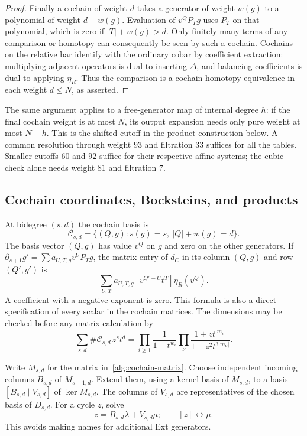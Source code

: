 \documentclass[11pt]{article}
\theoremstyle{definition}
\theoremstyle{remark}
\numberwithin{equation}{section}
\begin{document}
\begin{proof}
Finally a cochain of weight $d$ takes a generator of weight $w(g)$ to
a polynomial of weight $d-w(g)$.  Evaluation of $v^QP_Tg$ uses
$P_T$ on that polynomial, which is zero if $|T|+w(g)>d$.
Only finitely many terms of any comparison or homotopy can consequently
be seen by such a cochain.  Cochains on the relative bar identify with
the ordinary cobar by coefficient extraction: multiplying adjacent
operators is dual to inserting $\Delta$, and balancing coefficients
is dual to applying $\eta_R$.  Thus the comparison is a cochain
homotopy equivalence in each weight $d\leq N$, as asserted.
\end{proof}

The same argument applies to a free-generator map of internal degree
$h$: if the final cochain weight is at most $N$, its output expansion
needs only pure weight at most $N-h$.  This is the shifted cutoff in
the product construction below.  A common resolution through weight
$93$ and filtration $33$ suffices for all the tables.  Smaller cutoffs
$60$ and $92$ suffice for their respective affine systems; the cubic
check alone needs weight $81$ and filtration $7$.

\subsection{Cochain coordinates, Bocksteins, and products}

At bidegree $(s,d)$ the cochain basis is
\begin{equation}\label{alg:cochain-basis}
 \mathcal C_{s,d}=\{(Q,g):s(g)=s,\ |Q|+w(g)=d\}.
\end{equation}
The basis vector $(Q,g)$ has value $v^Q$ on $g$ and zero on the other
generators.  If
$\partial_{s+1}g'=\sum a_{U,T,g}v^UP_Tg$, the matrix entry of $d_C$
in its column $(Q,g)$ and row $(Q',g')$ is
\begin{equation}\label{alg:cochain-matrix}
 \sum_{U,T}a_{U,T,g}
       [v^{Q'-U}t^T]\eta_R(v^Q).
\end{equation}
A coefficient with a negative exponent is zero.  This formula is also
a direct specification of every scalar in the cochain matrices.
The dimensions may be checked before any matrix calculation by
\begin{equation}\label{alg:dimension-series}
 \sum_{s,d}\#\mathcal C_{s,d}\,z^st^d
 =\prod_{i\geq1}\frac1{1-t^{w_i}}
    \prod_{\nu}\frac{1+zt^{|m_\nu|}}
                       {1-z^2t^{3|m_\nu|}}.
\end{equation}

Write $M_{s,d}$ for the matrix in~\eqref{alg:cochain-matrix}.
Choose independent incoming columns $B_{s,d}$ of $M_{s-1,d}$.
Extend them, using a kernel basis of $M_{s,d}$, to a basis
$[B_{s,d}\mid V_{s,d}]$ of $\ker M_{s,d}$.  The columns of $V_{s,d}$
are representatives of the chosen basis of $D_{s,d}$.  For a cycle
$z$, solve
\begin{equation}\label{alg:quotient-coordinates}
 z=B_{s,d}\lambda+V_{s,d}\mu;
 \qquad [z]\longleftrightarrow\mu.
\end{equation}
This avoids making names for additional Ext generators.
\end{document}
